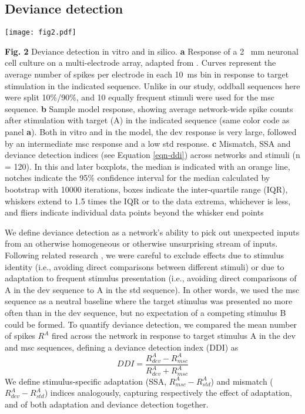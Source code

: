 \documentclass[pdflatex,referee,iicol,sn-basic]{sn-jnl}
\theoremstyle{thmstyleone}%
\theoremstyle{thmstyletwo}%
\theoremstyle{thmstylethree}%
\begin{document}
\subsection{Deviance detection}\label{sec-dd}

\begin{figure*}%
    \centering
    \texttt{[image: fig2.pdf]}
    \caption{}
    \label{fig2}
\end{figure*}
\textbf{Fig. 2} Deviance detection in vitro and in silico. \textbf{a} Response of a 2 ~mm neuronal cell culture on a multi-electrode array, adapted from \cite{Kubota2021-dx}. Curves represent the average number of spikes per electrode in each 10~ms bin in response to target stimulation in the indicated sequence. Unlike in our study, oddball sequences here were split 10\%/90\%, and 10 equally frequent stimuli were used for the msc sequence. \textbf{b} Sample model response, showing average network-wide spike counts after stimulation with target (A) in the indicated sequence (same color code as panel \textbf{a}). Both in vitro and in the model, the dev response is very large, followed by an intermediate msc response and a low std response. \textbf{c} Mismatch, SSA and deviance detection indices (see Equation \ref{eqn-ddi}) across networks and stimuli (n = 120). In this and later boxplots, the median is indicated with an orange line, notches indicate the 95\% confidence interval for the median calculated by bootstrap with 10000 iterations, boxes indicate the inter-quartile range (IQR), whiskers extend to 1.5 times the IQR or to the data extrema, whichever is less, and fliers indicate individual data points beyond the whisker end points

We define deviance detection as a network's ability to pick out unexpected inputs from an otherwise homogeneous or otherwise unsurprising stream of inputs. Following related research \citep{Kubota2021-dx,Harms2014-ah,Jacobsen2001-sc}, we were careful to exclude effects due to stimulus identity (i.e., avoiding direct comparisons between different stimuli) or due to adaptation to frequent stimulus presentation (i.e., avoiding direct comparisons of A in the dev sequence to A in the std sequence). In other words, we used the msc sequence as a neutral baseline where the target stimulus was presented no more often than in the dev sequence, but no expectation of a competing stimulus B could be formed. To quantify deviance detection, we compared the mean number of spikes $R^A$ fired across the network in response to target stimulus A in the dev and msc sequences, defining a deviance detection index (DDI) as
\begin{equation}
    DDI = \frac{R^A_{dev} - R^A_{msc}}{R^A_{dev} + R^A_{msc}} \label{eqn-ddi}
\end{equation}
We define stimulus-specific adaptation (SSA, $R^A_{msc} - R^A_{std}$) and mismatch ($R^A_{dev} - R^A_{std}$) indices analogously, capturing respectively the effect of adaptation, and of both adaptation and deviance detection together.
\end{document}
